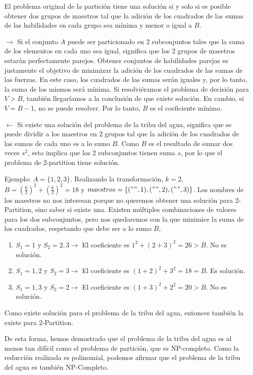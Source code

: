 \documentclass{article}
\begin{document}
El problema original de la partición tiene una solución si y solo si es posible obtener dos grupos de maestros tal que la adición de los cuadrados de las sumas de las habilidades en cada grupo sea mínima y menor o igual a $B$.

$\rightarrow$ Si el conjunto $A$ puede ser particionado en 2 subconjuntos tales que la suma de los elementos en cada uno sea igual, significa que los 2 grupos de maestros estarán perfectamente parejos. Obtener conjuntos de habilidades parejas es justamente el objetivo de minimizar la adición de los cuadrados de las sumas de las fuerzas. En este caso, los cuadrados de las sumas serán iguales y, por lo tanto, la suma de los mismos será mínima. Si resolviéramos el problema de decisión para $V > B$, también llegaríamos a la conclusión de que existe solución. En cambio, si $V = B - 1$, no se puede resolver. Por lo tanto, $B$ es el coeficiente mínimo.

$\leftarrow$ Si existe una solución del problema de la tribu del agua, significa que se puede dividir a los maestros en 2 grupos tal que la adición de los cuadrados de las sumas de cada uno es a lo sumo $B$. Como $B$ es el resultado de sumar dos veces $s^2$, esto implica que los 2 subconjuntos tienen suma $s$, por lo que el problema de 2-partition tiene solución.

Ejemplo: $A = \{1, 2, 3\}$. Realizando la transformación, $k = 2$, $B = (\frac{6}{2})^2 + (\frac{6}{2})^2 = 18$ y $maestros = \{("", 1), ("", 2), ("", 3)\}$. Los nombres de los maestros no nos interesan porque no queremos obtener una solución para 2-Partition, sino saber si existe una. Existen múltiples combinaciones de valores para los dos subconjuntos, pero nos quedaremos con la que minimice la suma de los cuadrados, respetando que debe ser a lo sumo $B$,
\begin{enumerate}
    \item $S_1 = {1}$ y $S_2 = {2, 3} \rightarrow$ El coeficiente es $1^2 + (2 + 3)^2 = 26 > B$. No es solución.
    \item $S_1 = {1, 2}$ y $S_2 = {3} \rightarrow$ El coeficiente es $(1 + 2)^2 + 3^2 = 18 = B$. Es solución.
    \item $S_1 = {1, 3}$ y $S_2 = {2} \rightarrow$ El coeficiente es $(1 + 3)^2 + 2^2 = 20 > B$. No es solución.    
\end{enumerate}
Como existe solución para el problema de la tribu del agua, entonces también la existe para 2-Partition.

De esta forma, hemos demostrado que el problema de la tribu del agua es al menos tan difícil como el problema de partición, que es NP-completo. Como la reducción realizada es polinomial, podemos afirmar que el problema de la tribu del agua es también NP-Completo.
\end{document}
